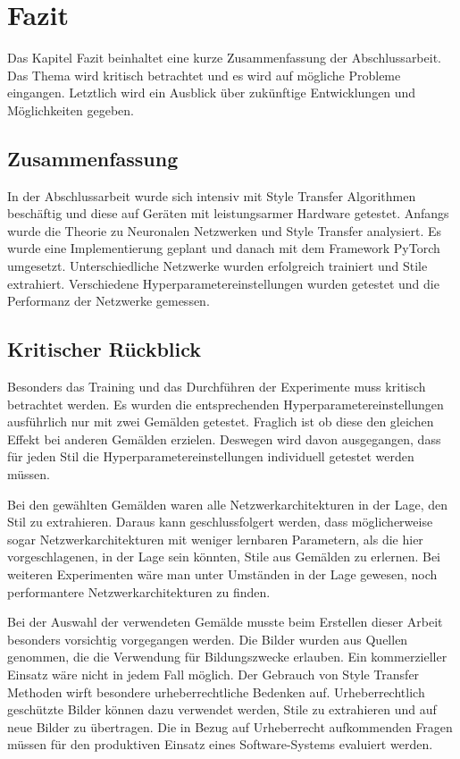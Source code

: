 \chapter{Fazit}

Das Kapitel Fazit beinhaltet eine kurze Zusammenfassung der Abschlussarbeit. Das Thema wird kritisch betrachtet und es wird auf mögliche Probleme eingangen. Letztlich wird ein Ausblick über zukünftige Entwicklungen und Möglichkeiten gegeben.

\section{Zusammenfassung}

In der Abschlussarbeit wurde sich intensiv mit Style Transfer Algorithmen beschäftig und diese auf Geräten mit leistungsarmer Hardware getestet. Anfangs wurde die Theorie zu Neuronalen Netzwerken und Style Transfer analysiert. Es wurde eine Implementierung geplant und danach mit dem Framework PyTorch umgesetzt. Unterschiedliche Netzwerke wurden erfolgreich trainiert und Stile extrahiert. Verschiedene Hyperparametereinstellungen wurden getestet und die Performanz der Netzwerke gemessen.


\section{Kritischer Rückblick}

Besonders das Training und das Durchführen der Experimente muss kritisch betrachtet werden. Es wurden die entsprechenden Hyperparametereinstellungen ausführlich nur mit zwei Gemälden getestet. Fraglich ist ob diese den gleichen Effekt bei anderen Gemälden erzielen. Deswegen wird davon ausgegangen, dass für jeden Stil die Hyperparametereinstellungen individuell getestet werden müssen.

Bei den gewählten Gemälden waren alle Netzwerkarchitekturen in der Lage, den Stil zu extrahieren. Daraus kann geschlussfolgert werden, dass möglicherweise sogar Netzwerkarchitekturen mit weniger lernbaren Parametern, als die hier vorgeschlagenen, in der Lage sein könnten, Stile aus Gemälden zu erlernen. Bei weiteren Experimenten wäre man unter Umständen in der Lage gewesen, noch performantere Netzwerkarchitekturen zu finden.

Bei der Auswahl der verwendeten Gemälde musste beim Erstellen dieser Arbeit besonders vorsichtig vorgegangen werden. Die Bilder wurden aus Quellen genommen, die die Verwendung für Bildungszwecke erlauben. Ein kommerzieller Einsatz wäre nicht in jedem Fall möglich. Der Gebrauch von Style Transfer Methoden wirft besondere urheberrechtliche Bedenken auf. Urheberrechtlich geschützte Bilder können dazu verwendet werden, Stile zu extrahieren und auf neue Bilder zu übertragen. Die in Bezug auf Urheberrecht aufkommenden Fragen müssen für den produktiven Einsatz eines Software-Systems evaluiert werden.

